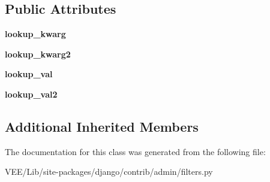 \subsection*{Public Attributes}
\begin{DoxyCompactItemize}
\item 
\mbox{\label{classdjango_1_1contrib_1_1admin_1_1filters_1_1_boolean_field_list_filter_a59ad13adaafb249dbc9da8d531ffba25}} 
{\bfseries lookup\+\_\+kwarg}
\item 
\mbox{\label{classdjango_1_1contrib_1_1admin_1_1filters_1_1_boolean_field_list_filter_af0db6e17d1cae8ba103f40f4b8b8131f}} 
{\bfseries lookup\+\_\+kwarg2}
\item 
\mbox{\label{classdjango_1_1contrib_1_1admin_1_1filters_1_1_boolean_field_list_filter_afa011163700e845a3f737d1e461ba506}} 
{\bfseries lookup\+\_\+val}
\item 
\mbox{\label{classdjango_1_1contrib_1_1admin_1_1filters_1_1_boolean_field_list_filter_a284a866c4c2e1a172935385478257776}} 
{\bfseries lookup\+\_\+val2}
\end{DoxyCompactItemize}
\subsection*{Additional Inherited Members}


The documentation for this class was generated from the following file\+:\begin{DoxyCompactItemize}
\item 
V\+E\+E/\+Lib/site-\/packages/django/contrib/admin/filters.\+py\end{DoxyCompactItemize}
